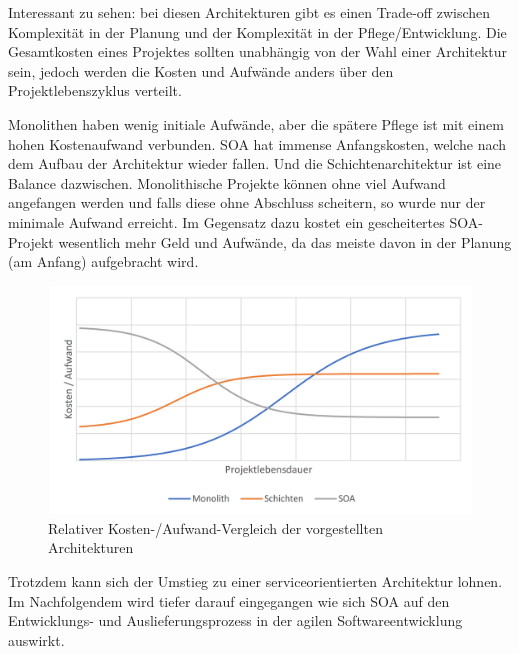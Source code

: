 Interessant zu sehen: bei diesen Architekturen gibt es einen Trade-off zwischen Komplexität in der Planung und der Komplexität in der Pflege/Entwicklung. Die Gesamtkosten eines Projektes sollten unabhängig von der Wahl einer Architektur sein, jedoch werden die Kosten und Aufwände anders über den Projektlebenszyklus verteilt. 

\newpage
Monolithen haben wenig initiale Aufwände, aber die spätere Pflege ist mit einem hohen Kostenaufwand verbunden. SOA hat immense Anfangskosten, welche nach dem Aufbau der Architektur wieder fallen. Und die Schichtenarchitektur ist eine Balance dazwischen. Monolithische Projekte können ohne viel Aufwand angefangen werden und falls diese ohne Abschluss scheitern, so wurde nur der minimale Aufwand erreicht. Im Gegensatz dazu kostet ein gescheitertes SOA-Projekt wesentlich mehr Geld und Aufwände, da das meiste davon in der Planung (am Anfang) aufgebracht wird.

\begin{figure}[H]
    \centering
    \includegraphics[width=.9\textwidth]{images/archgraph.png}
    \caption{Relativer Kosten-/Aufwand-Vergleich der vorgestellten Architekturen}
\end{figure}

Trotzdem kann sich der Umstieg zu einer serviceorientierten Architektur lohnen. Im Nachfolgendem wird tiefer darauf eingegangen wie sich SOA auf den Entwicklungs- und Auslieferungsprozess in der agilen Softwareentwicklung auswirkt.
